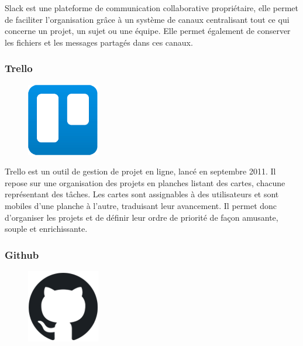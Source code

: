 Slack est une plateforme de communication collaborative propriétaire, elle 
permet de faciliter l’organisation grâce à un système de canaux centralisant 
tout ce qui concerne un projet, un sujet ou une équipe. Elle permet également 
de conserver les fichiers et les messages partagés dans ces canaux\cite{37}. 

\clearpage

\subsubsection*{Trello}
\begin{figure}
    \vspace{-22pt}
    \begin{center}
        \includegraphics[scale=0.36]{images/logo/trello.png}
        \label{fig63}
    \end{center}
    \vspace{-20pt}
    \vspace{-10pt}
\end{figure}

Trello est un outil de gestion de projet en ligne, lancé en septembre 2011. Il 
repose sur une organisation des projets en planches listant des cartes, chacune 
représentant des tâches. Les cartes sont assignables à des utilisateurs et sont 
mobiles d’une planche à l’autre, traduisant leur avancement. Il permet donc 
d’organiser les projets et de définir leur ordre de priorité de façon amusante, 
souple et enrichissante\cite{38}.

\subsubsection*{Github}
\begin{figure}
    \vspace{-22pt}
    \begin{center}
        \includegraphics[scale=0.36]{images/logo/github.png}
        \label{fig64}
    \end{center}
    \vspace{-20pt}
    \vspace{-10pt}
\end{figure}

